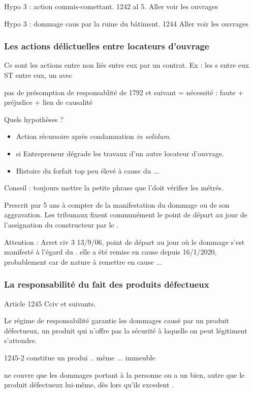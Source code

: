 			Hypo 3 : action commis-comettant. 1242 al 5. Aller voir les ouvrages

			Hypo 3 : dommage caus par la ruine du bâtiment. 1244 Aller voir les ouvrages

		\subsubsection{Les actions délictuelles entre locateurs d'ouvrage}

			Ce sont les actions entre \lo non liés entre eux par un contrat. Ex : les \E{}s entre eux ST entre eux, un \E avec

			pas de présomption de responsablité de 1792 et suivant = nécessité : faute + préjudice + lien de causalité

			Quels hypothèses ?
			\begin{itemize}
				\item Action récursoire après condamnation \emph{in solidum}.
				\item si Entrepreneur dégrade les travaux d'un autre locateur d'ouvrage.
				\item Histoire du forfait top peu élevé à cause du \Moe...
			\end{itemize}

			Conseil : toujours mettre la petite phrase que l'\E doit vérifier les métrés.

			Prescrit par 5 ans à compter de la manifestation du dommage ou de son aggravation. Les tribunaux fixent communément le point de départ au jour de l'assignation du constructeur par le \Mo.

			Attention : Arret civ 3 13/9/06, point de départ au jour où le dommage s'est manifesté à l'égard du \Mo. elle a été remise en cause depuis 16/1/2020, probablement car de nature à remettre en cause ...

		\subsubsection{La responsabilité du fait des produits défectueux}

			Article 1245 Cciv et suivants.

			Le régime de responsabilité garantie les dommages causé par un produit défectueux, \cad un produit qui n'offre pas la sécurité à laquelle on peut légitiment s'attendre.

			1245-2 constitue un produi .. même ... immeuble

			ne couvre que les dommages portant à la personne ou a un bien, autre que le produit défectueux lui-même, dès lors qu'ils excedent .

